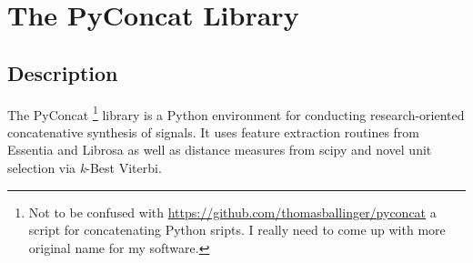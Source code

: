 %	
%

\chapter{The PyConcat Library}
\label{app:pyconcat}

\section{Description}

The PyConcat \footnote{Not to be confused with \url{https://github.com/thomasballinger/pyconcat} a script for concatenating Python sripts. I really need to come up with more original name for my software.} library is a Python environment for conducting research-oriented concatenative synthesis of signals. It uses feature extraction routines from Essentia and Librosa as well as distance measures from scipy and novel unit selection via \textit{k}-Best Viterbi.

